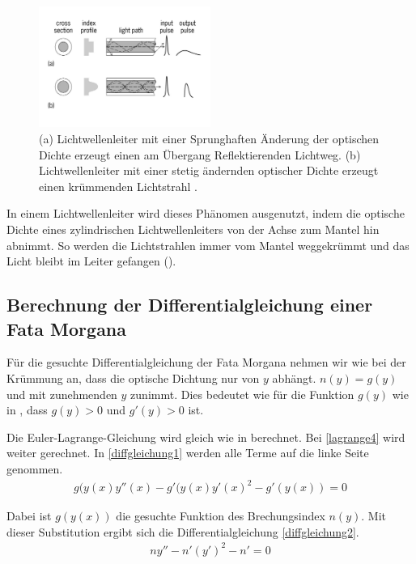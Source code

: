 \begin{figure}[H]
\begin{center}
\includegraphics[width=0.5\textwidth]{./picture/Lichtwellenleiter.pdf}
	\caption{(a) Lichtwellenleiter mit einer Sprunghaften Änderung der optischen Dichte erzeugt einen am Übergang Reflektierenden Lichtweg. 
	(b) Lichtwellenleiter mit einer stetig ändernden optischer Dichte erzeugt einen krümmenden Lichtstrahl \cite{opticFibre}. }
	\label{lichtleiter}
\end{center}	
\end{figure}

In einem Lichtwellenleiter wird dieses Phänomen ausgenutzt, 
indem  die  optische  Dichte  eines  zylindrischen
Lichtwellenleiters  von  der Achse zum Mantel hin abnimmt.
So werden die Lichtstrahlen immer vom Mantel weggekrümmt 
und das Licht  bleibt im Leiter gefangen ().


\subsection{Berechnung der Differentialgleichung einer Fata Morgana}

Für die gesuchte Differentialgleichung der Fata Morgana nehmen wir wie bei der Krümmung an, dass die optische Dichtung nur von $y$ abhängt. 
$n(y) = g(y)$ und mit zunehmenden $y$ zunimmt. Dies bedeutet wie für die Funktion $g(y)$ wie in , dass $g(y) > 0$ und $g'(y) > 0 $ ist.

Die Euler-Lagrange-Gleichung wird gleich wie in  berechnet. Bei \eqref{lagrange4} wird weiter gerechnet. In \eqref{diffgleichung1} werden alle Terme auf die linke Seite genommen.
\begin{align}
	g(y(x) y''(x)-g'(y(x) y'(x)^2 - g'(y(x)) =0 
	\label{diffgleichung1}
\end{align}

Dabei ist $g(y(x))$ die gesuchte Funktion des Brechungsindex $n(y)$. Mit dieser Substitution ergibt sich die Differentialgleichung \ref{diffgleichung2}.
\begin{align}
	n y''-n' (y')^2 - n' =0 
	\label{diffgleichung2}
\end{align}

